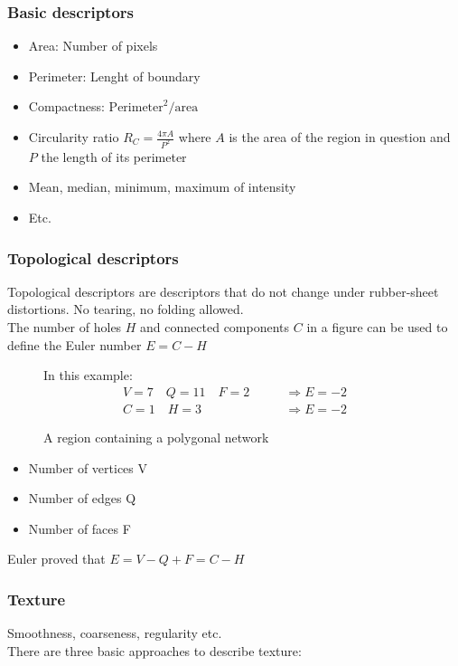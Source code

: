 \subsubsection{Basic descriptors}
\begin{itemize}
\item Area: Number of pixels
\item Perimeter: Lenght of boundary
\item Compactness: $\text{Perimeter}^2/\text{area}$
\item Circularity ratio $R_C=\frac{4\pi A}{P^2}$ where $A$ is the area of the region in question and $P$ the length of its perimeter
\item Mean, median, minimum, maximum of intensity
\item Etc.
\end{itemize}
\subsubsection{Topological descriptors}
Topological descriptors are descriptors that do not change under rubber-sheet distortions. No tearing, no folding allowed.\\
The number of holes $H$ and connected components $C$ in a figure can be used to define the Euler number $E=C-H$\\

\begin{figure}[h]
	\centering
	\caption{A region containing a polygonal network}

	In this example: \\
	\begin{align*}
	V=7 \quad Q=11 \quad F=2 \qquad &\Rightarrow E=-2 \\
	C=1 \quad H=3 \qquad &\Rightarrow E=-2
	\end{align*}

\end{figure}

\begin{itemize}
\item Number of vertices V
\item Number of edges Q
\item Number of faces F
\end{itemize}
Euler proved that $E=V-Q+F=C-H$
\subsubsection{Texture}
Smoothness, coarseness, regularity etc.\\
There are three basic approaches to describe texture:\\

